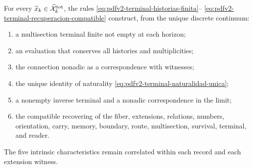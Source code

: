 \begin{theorem}
\label{thm:pdfv2-terminal-conjunto}
For every \(\widehat x_k\in\widehat{\mathcal X}^{\rm tot}_k\), the rules
\eqref{eq:pdfv2-terminal-historias-finita}--
\eqref{eq:pdfv2-terminal-recuperacion-compatible} construct, from the
unique discrete continuum:
\begin{enumerate}
 \item a multisection terminal finite not empty at each horizon;
 \item an evaluation that conserves all histories and multiplicities;
 \item the connection nonadic as a correspondence with witnesses;
 \item the unique identity of naturality
       \eqref{eq:pdfv2-terminal-naturalidad-unica};
 \item a nonempty inverse terminal and a nonadic correspondence in the
       limit;
 \item the compatible recovering of the fiber, extensions, relations,
       numbers, orientation, carry, memory, boundary, route,
       multisection, survival, terminal, and reader.
\end{enumerate}
The five intrinsic characteristics remain correlated within
each record and each extension witness.
\end{theorem}

